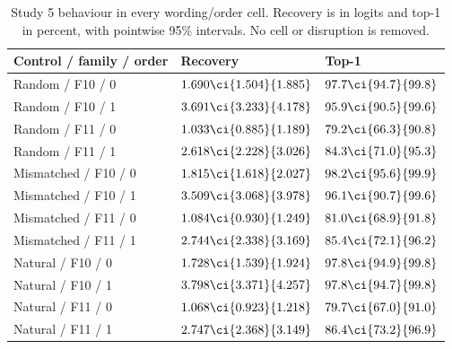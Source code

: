 \begin{table}[H]
\centering\footnotesize
\setlength{\tabcolsep}{3pt}
\caption{Study 5 behaviour in every wording/order cell. Recovery is in logits and top-1 in percent, with pointwise 95\% intervals. No cell or disruption is removed.}
\label{tab:null-cell-behaviour}
\begin{tabularx}{\linewidth}{@{}lYY@{}}
\toprule
Control / family / order & Recovery & Top-1 \\
\midrule
Random / F10 / 0 & $1.690\ci{1.504}{1.885}$ & $97.7\ci{94.7}{99.8}$ \\
Random / F10 / 1 & $3.691\ci{3.233}{4.178}$ & $95.9\ci{90.5}{99.6}$ \\
Random / F11 / 0 & $1.033\ci{0.885}{1.189}$ & $79.2\ci{66.3}{90.8}$ \\
Random / F11 / 1 & $2.618\ci{2.228}{3.026}$ & $84.3\ci{71.0}{95.3}$ \\
Mismatched / F10 / 0 & $1.815\ci{1.618}{2.027}$ & $98.2\ci{95.6}{99.9}$ \\
Mismatched / F10 / 1 & $3.509\ci{3.068}{3.978}$ & $96.1\ci{90.7}{99.6}$ \\
Mismatched / F11 / 0 & $1.084\ci{0.930}{1.249}$ & $81.0\ci{68.9}{91.8}$ \\
Mismatched / F11 / 1 & $2.744\ci{2.338}{3.169}$ & $85.4\ci{72.1}{96.2}$ \\
Natural / F10 / 0 & $1.728\ci{1.539}{1.924}$ & $97.8\ci{94.9}{99.8}$ \\
Natural / F10 / 1 & $3.798\ci{3.371}{4.257}$ & $97.8\ci{94.7}{99.8}$ \\
Natural / F11 / 0 & $1.068\ci{0.923}{1.218}$ & $79.7\ci{67.0}{91.0}$ \\
Natural / F11 / 1 & $2.747\ci{2.368}{3.149}$ & $86.4\ci{73.2}{96.9}$ \\
\bottomrule
\end{tabularx}
\end{table}

